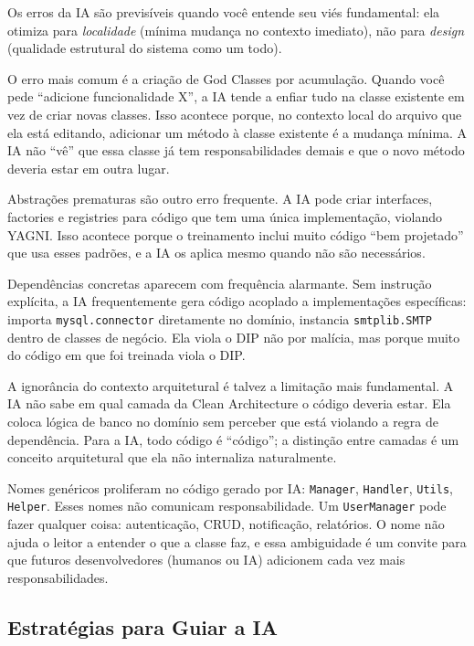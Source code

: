 Os erros da IA são previsíveis quando você entende seu viés fundamental: ela
otimiza para \emph{localidade} (mínima mudança no contexto imediato), não
para \emph{design} (qualidade estrutural do sistema como um todo).

O erro mais comum é a criação de God Classes por acumulação. Quando você
pede ``adicione funcionalidade X'', a IA tende a enfiar tudo na classe
existente em vez de criar novas classes. Isso acontece porque, no contexto
local do arquivo que ela está editando, adicionar um método à classe
existente é a mudança mínima. A IA não ``vê'' que essa classe já tem
responsabilidades demais e que o novo método deveria estar em outra lugar.

Abstrações prematuras são outro erro frequente. A IA pode criar interfaces,
factories e registries para código que tem uma única implementação, violando
YAGNI. Isso acontece porque o treinamento inclui muito código
``bem projetado'' que usa esses padrões, e a IA os aplica mesmo quando não
são necessários.

Dependências concretas aparecem com frequência alarmante. Sem instrução
explícita, a IA frequentemente gera código acoplado a implementações
específicas: importa \texttt{mysql.connector} diretamente no domínio,
instancia \texttt{smtplib.SMTP} dentro de classes de negócio. Ela viola
o DIP não por malícia, mas porque muito do código em que foi treinada
viola o DIP.

A ignorância do contexto arquitetural é talvez a limitação mais fundamental.
A IA não sabe em qual camada da Clean Architecture o código deveria estar.
Ela coloca lógica de banco no domínio sem perceber que está violando a
regra de dependência. Para a IA, todo código é ``código''; a distinção
entre camadas é um conceito arquitetural que ela não internaliza naturalmente.

Nomes genéricos proliferam no código gerado por IA: \texttt{Manager},
\texttt{Handler}, \texttt{Utils}, \texttt{Helper}. Esses nomes não
comunicam responsabilidade. Um \texttt{UserManager} pode fazer qualquer
coisa: autenticação, CRUD, notificação, relatórios. O nome não ajuda
o leitor a entender o que a classe faz, e essa ambiguidade é um convite
para que futuros desenvolvedores (humanos ou IA) adicionem cada vez mais
responsabilidades.

\subsection{Estratégias para Guiar a IA}

